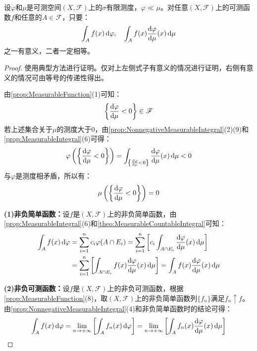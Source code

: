 \begin{lemma}\label{lem:IntChangeOfMeasure}
	设$\varphi$和$\mu$是可测空间$(X,\mathscr{F})$上的$\sigma$有限测度，$\varphi\ll\mu$。对任意$(X,\mathscr{F})$上的可测函数$f$和任意的$A\in\mathscr{F}$，只要：
	\begin{equation*}
		\int_{A}f(x)\mathop{}\!\mathrm{d}\varphi,\quad\int_{A}f(x)\frac{\mathop{}\!\mathrm{d}\varphi}{\mathop{}\!\mathrm{d}\mu}(x)\mathop{}\!\mathrm{d}\mu
	\end{equation*}
	之一有意义，二者一定相等。
\end{lemma}
\begin{proof}
	使用典型方法进行证明。仅对上左侧式子有意义的情况进行证明，右侧有意义的情况可由等号的传递性得出。\par
	由\cref{prop:MeasurableFunction}(1)可知：
	\begin{equation*}
		\left\{\frac{\mathop{}\!\mathrm{d}\varphi}{\mathop{}\!\mathrm{d}\mu}<0\right\}\in\mathscr{F}
	\end{equation*}
	若上述集合关于$\mu$的测度大于$0$，由\cref{prop:NonnegativeMeasurableIntegral}(2)(9)和\cref{prop:MeasurableIntegral}(6)可得：
	\begin{equation*}
		\varphi\left(\left\{\frac{\mathop{}\!\mathrm{d}\varphi}{\mathop{}\!\mathrm{d}\mu}<0\right\}\right)=\int_{\left\{\frac{\mathop{}\!\mathrm{d}\varphi}{\mathop{}\!\mathrm{d}\mu}<0\right\}}\frac{\mathop{}\!\mathrm{d}\varphi}{\mathop{}\!\mathrm{d}\mu}(x)\mathop{}\!\mathrm{d}\mu<0
	\end{equation*}
	与$\varphi$是测度相矛盾，所以有：
	\begin{equation*}
		\mu\left(\left\{\frac{\mathop{}\!\mathrm{d}\varphi}{\mathop{}\!\mathrm{d}\mu}<0\right\}\right)=0
	\end{equation*}\par
	\textbf{(1)非负简单函数：}设$f$是$(X,\mathscr{F})$上的非负简单函数，由\cref{prop:MeasurableIntegral}(6)和\cref{theo:MeasurableCountableIntegral}可知：
	\begin{align*}
		\int_{A}f(x)\dif\varphi&=\sum_{i=1}^{n}c_i\varphi(A\cap E_i)=\sum_{i=1}^{n}\left[c_i\int_{A\cap E_i}\frac{\dif\varphi}{\dif\mu}(x)\dif\mu\right] \\
		&=\sum_{i=1}^{n}\left[\int_{A\cap E_i}f(x)\frac{\dif\varphi}{\dif\mu}(x)\dif\mu\right]=\int_{A}f(x)\frac{\dif\varphi}{\dif\mu}(x)\dif\mu
	\end{align*}\par
	\textbf{(2)非负可测函数：}设$f$是$(X,\mathscr{F})$上的非负可测函数，根据\cref{prop:MeasurableFunction}(8)，取$(X,\mathscr{F})$上的非负简单函数列$\{f_n\}$满足$f_n\uparrow f$。由\cref{prop:NonnegativeMeasurableIntegral}(4)和非负简单函数时的结论可得：
	\begin{equation*}
		\int_{A}f(x)\dif\varphi=\lim_{n\to+\infty}\left[\int_{A}f_n(x)\dif\varphi\right]=\lim_{n\to+\infty}\left[\int_{A}f_n(x)\frac{\dif\varphi}{\dif\mu}(x)\dif\mu\right]

\end{equation*}
\end{proof}
